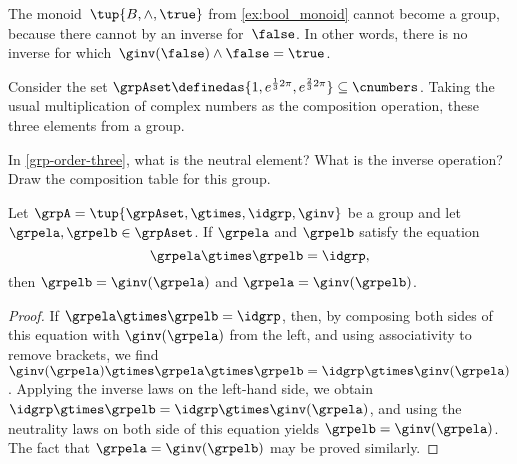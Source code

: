 \begin{example}
  The monoid~$\tup{B,\wedge, \true}$ from \cref{ex:bool_monoid} cannot become a group, because there cannot by an inverse for~$\false$. In other words, there is no inverse for which~$\ginv(\false)\wedge \false=\true$.
\end{example}
\begin{example}
  \label{grp-order-three}
  Consider the set $\grpAset \definedas \{ 1, e^{\frac{1}{3} 2 \pi}, e^{\frac{2 }{3} 2 \pi}  \} \subseteq \cnumbers$.
  Taking the usual multiplication of complex numbers as the composition operation, these three elements from a group.
\end{example}

\begin{gradedexercise}
  In \cref{grp-order-three}, what is the neutral element? What is the inverse operation?
  Draw the composition table for this group.
\end{gradedexercise}

\begin{solution}
\end{solution}


\begin{lemma}
 \label{lem:inv-op-unique}
Let $\grpA = \tup{ \grpAset, \gtimes, \idgrp, \ginv }$ be a group and let $\grpela, \grpelb \in \grpAset$. If $\grpela$ and $\grpelb$ satisfy the equation
$$
\grpela \gtimes \grpelb = \idgrp,
$$
then $\grpelb = \ginv( \grpela )$ and $\grpela = \ginv(\grpelb)$. 
\end{lemma}

\begin{proof}
If $\grpela \gtimes \grpelb = \idgrp$, then, by composing both sides of this equation with $\ginv(\grpela)$ from the left, and using associativity to remove brackets, we find $\ginv(\grpela) \gtimes \grpela \gtimes \grpelb = \idgrp \gtimes \ginv(\grpela)$. Applying the inverse laws on the left-hand side, we obtain $\idgrp \gtimes \grpelb = \idgrp \gtimes \ginv(\grpela)$, and using the neutrality laws on both side of this equation yields $ \grpelb =  \ginv(\grpela)$. The fact that $\grpela = \ginv(\grpelb)$ may be proved similarly. 
\end{proof}


